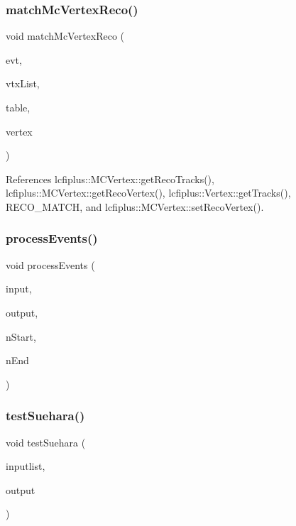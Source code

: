 \subsubsection{match\+Mc\+Vertex\+Reco()}
{\footnotesize\ttfamily void match\+Mc\+Vertex\+Reco (\begin{DoxyParamCaption}\item[{const \textbf{ Event} \&}]{evt,  }\item[{const vector$<$ \textbf{ M\+C\+Vertex} $\ast$$>$ \&}]{vtx\+List,  }\item[{map$<$ \textbf{ M\+C\+Vertex} $\ast$, int $>$ \&}]{table,  }\item[{\textbf{ Vertex} $\ast$}]{vertex }\end{DoxyParamCaption})}



References lcfiplus\+::\+M\+C\+Vertex\+::get\+Reco\+Tracks(), lcfiplus\+::\+M\+C\+Vertex\+::get\+Reco\+Vertex(), lcfiplus\+::\+Vertex\+::get\+Tracks(), R\+E\+C\+O\+\_\+\+M\+A\+T\+CH, and lcfiplus\+::\+M\+C\+Vertex\+::set\+Reco\+Vertex().

\mbox{\label{Driver_8h_ac871fb1f5d53080e360234c6b12713cd}} 
\subsubsection{process\+Events()}
{\footnotesize\ttfamily void process\+Events (\begin{DoxyParamCaption}\item[{const char $\ast$}]{input,  }\item[{const char $\ast$}]{output,  }\item[{int}]{n\+Start,  }\item[{int}]{n\+End }\end{DoxyParamCaption})}

\mbox{\label{Driver_8h_a708e3c96c6e0061b7ac97a948a31325a}} 
\subsubsection{test\+Suehara()}
{\footnotesize\ttfamily void test\+Suehara (\begin{DoxyParamCaption}\item[{const char $\ast$}]{inputlist,  }\item[{const char $\ast$}]{output }\end{DoxyParamCaption})}




